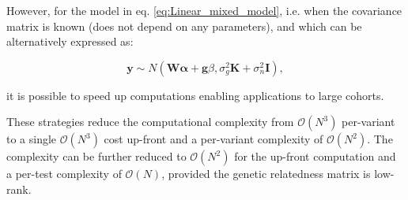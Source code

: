 



However, for the model in eq. \eqref{eq:Linear_mixed_model}, i.e. when the covariance matrix is known (does not depend on any parameters), and which can be alternatively expressed as:

\begin{equation}\label{eq:LMM_MVN}
 \mathbf{y} \sim  N(\mathbf{W}\boldsymbol{\alpha} + \mathbf{g}\beta, \sigma_g^2\mathbf{K} + \sigma_n^2\mathbf{I}),
\end{equation}

it is possible to speed up computations \cite{kang2008efficient, kang2010variance, lippert2011fast, zhou2012genome} enabling applications to large cohorts. 

These strategies reduce the computational complexity from $\mathcal{O}(N^3)$
per-variant to a single  $\mathcal{O}(N^3)$ cost up-front and a per-variant complexity of  $\mathcal{O}(N^2)$.
The complexity can be further reduced to $\mathcal{O}(N^2)$ for the up-front computation and a per-test complexity of  $\mathcal{O}(N)$, provided the genetic relatedness matrix is low-rank. \\





